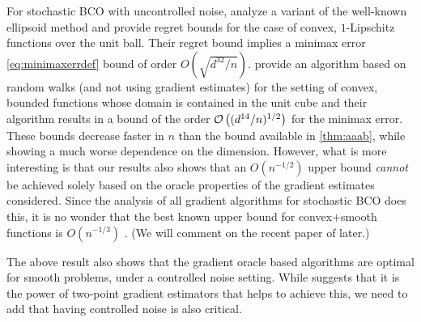 For stochastic BCO with uncontrolled noise, \citet{AgFoHsuKaRa13:SIAM} analyze a variant of the well-known ellipsoid method and provide regret bounds for the case of convex, $1$-Lipschitz functions over the unit ball. 
Their regret bound implies a minimax error \eqref{eq:minimaxerrdef} bound of order  $O\left(\sqrt{d^{32}/n}\right)$. 
\citet{liang2014zeroth} provide an algorithm based on random walks (and not using gradient estimates) for the setting of convex, bounded functions whose domain is contained in the unit cube and their algorithm results in a bound of the order $\mathcal{O}\left((d^{14}/n)^{1/2}\right)$ for the minimax error.
These bounds decrease faster in $n$ than the bound available in \cref{thm:aaab}, while showing a much worse dependence on the dimension.
However, what is more interesting is that our results also shows that an $O(n^{-1/2})$ upper bound \emph{cannot} be achieved solely based on the oracle properties of the gradient estimates considered. Since the analysis of all gradient algorithms for stochastic BCO does this, it is no wonder that the best known upper bound for convex+smooth functions is $O(n^{-1/3})$ \citep{saha2011improved}. (We will comment on the recent paper of \citet{DeElKo15} later.)

The above result also shows that the gradient oracle based algorithms are optimal for smooth problems, under a controlled noise setting.
While \citet{duchi2015optimal} suggests that it is the power of two-point gradient estimators that helps to achieve this, we need to add that having controlled noise is also critical. %

